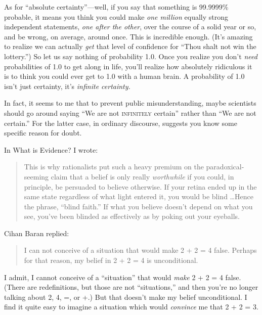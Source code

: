 {
 As for ``absolute
certainty''---well, if you say that something is
99.9999\% probable, it means you think you could make \textit{one
million} equally strong independent statements, \textit{one after the
other}, over the course of a solid year or so, and be wrong, on
average, around once. This is incredible enough. (It's
amazing to realize we can actually \textit{get} that level of
confidence for ``Thou shalt not win the
lottery.'') So let us say nothing of probability 1.0.
Once you realize you don't \textit{need} probabilities
of 1.0 to get along in life, you'll realize how
absolutely ridiculous it is to think you could ever get to 1.0 with a
human brain. A probability of 1.0 isn't just certainty,
it's \textit{infinite certainty.}}

{
 In fact, it seems to me that to prevent public misunderstanding,
maybe scientists should go around saying ``We are not
\textsc{infinitely} certain'' rather than
``We are not certain.'' For the
latter case, in ordinary discourse, suggests you know some specific
reason for doubt.}

\myendsectiontext


{
 In What is Evidence? I wrote:}

\begin{quote}
{
 This is why rationalists put such a heavy premium on the
paradoxical-seeming claim that a belief is only really
\textit{worthwhile} if you could, in principle, be persuaded to believe
otherwise. If your retina ended up in the same state regardless of what
light entered it, you would be blind \ldots Hence the phrase,
``blind faith.'' If what you believe
doesn't depend on what you see, you've
been blinded as effectively as by poking out your eyeballs.}
\end{quote}

{
 Cihan Baran replied:}

\begin{quote}
{
 I can not conceive of a situation that would make 2 + 2 = 4 false.
 Perhaps for that reason, my belief in 2 + 2 = 4 is unconditional.}
\end{quote}

{
 I admit, I cannot conceive of a
``situation'' that would
\textit{make} 2 + 2 = 4 false. (There are redefinitions, but those are
not ``situations,'' and then
you're no longer talking about 2, 4, =, or +.) But that
doesn't make my belief unconditional. I find it quite
easy to imagine a situation which would \textit{convince} me that 2 + 2
= 3.}

